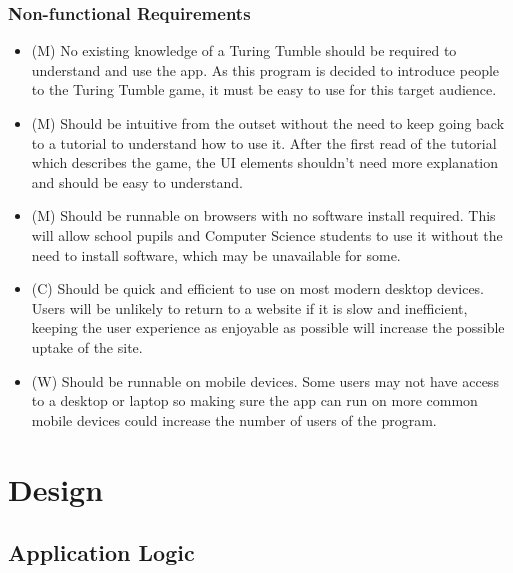 \documentclass{l4proj}
\begin{document}
\subsection{Non-functional Requirements}
\begin{itemize}
    \item (M) No existing knowledge of a Turing Tumble should be required to understand and use the app. As this program is decided to introduce people to the Turing Tumble game, it must be easy to use for this target audience.
    \item (M) Should be intuitive from the outset without the need to keep going back to a tutorial to understand how to use it. After the first read of the tutorial which describes the game, the UI elements shouldn't need more explanation and should be easy to understand.
    \item (M) Should be runnable on browsers with no software install required. This will allow school pupils and Computer Science students to use it without the need to install software, which may be unavailable for some.
    \item (C) Should be quick and efficient to use on most modern desktop devices. Users will be unlikely to return to a website if it is slow and inefficient, keeping the user experience as enjoyable as possible will increase the possible uptake of the site.
    \item (W) Should be runnable on mobile devices. Some users may not have access to a desktop or laptop so making sure the app can run on more common mobile devices could increase the number of users of the program.
\end{itemize}

\chapter{Design}
\section{Application Logic}
\label{section:design}
\end{document}
